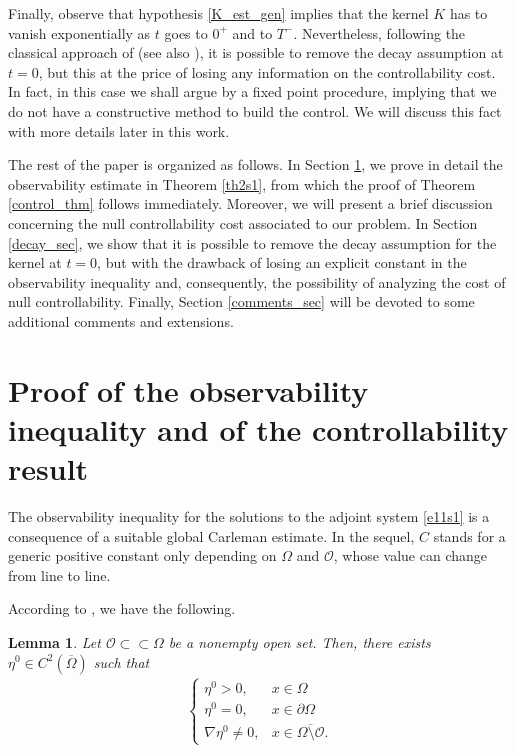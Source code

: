 \documentclass{amsart}    %
\newtheorem{lemma}{\bf Lemma}[section]
\begin{document}
Finally, observe that hypothesis \eqref{K_est_gen} implies that the kernel $K$ has to vanish exponentially as $t$ goes to $0^+$ and to $T^-$. Nevertheless, following the classical approach of \cite{fernandez2004local} (see also \cite{tao2016null}), it is possible to remove the decay assumption at $t=0$, but this at the price of losing any information on the controllability cost. In fact, in this case we shall argue by a fixed point procedure, implying that we do not have a constructive method to build the control. We will discuss this fact with more details later in this work.  

The rest of the paper is organized as follows. In Section \ref{obs_sec}, we prove in detail the observability estimate in Theorem \ref{th2s1}, from which the proof of Theorem \ref{control_thm} follows immediately. Moreover, we will present a brief discussion concerning the null controllability cost associated to our problem. In Section \ref{decay_sec}, we show that it is possible to remove the decay assumption for the kernel at $t=0$, but with the drawback of losing an explicit constant in the observability inequality and, consequently, the possibility of analyzing the cost of null controllability. Finally, Section \ref{comments_sec} will be devoted to some additional comments and extensions.

\section{Proof of the observability inequality and of the controllability result}\label{obs_sec}
The observability inequality for the solutions to the adjoint system \eqref{e11s1} is a consequence of a suitable global Carleman estimate. In the sequel, $C$ stands for a generic positive constant only depending on $\Omega$ and ${\mathcal O}$, whose value can change from line to line.

According to \cite[Lemma 1.1]{fursikov1996controllability}, we have the following. 

\begin{lemma}
Let $\mathcal O\subset\subset \Omega$ be a nonempty open set. Then, there exists $\eta^0\in C^2(\overline{\Omega})$ such that
\begin{align*}
	\begin{cases}
		\eta^0>0, & x\in\Omega
		\\
		\eta^0 = 0, & x\in\partial\Omega
		\\
		\nabla\eta^0\neq 0, & x\in\overline{\Omega\setminus{ \mathcal O}}.
	\end{cases}
\end{align*}
\end{lemma}
\end{document}
